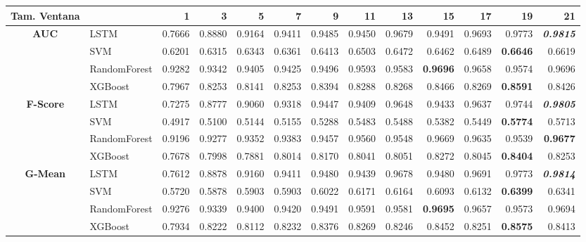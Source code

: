 \begin{table}[H]
	\centering
	\begin{adjustbox}{max width=14cm}
		\begin{tabular}{|c|l|r|r|r|r|r|r|r|r|r|r|r|}
			\hline
			\textbf{Tam. Ventana}&         &      1  &      3  &      5  &      7  &      9  &      11 &      13 &      15 &      17 &      19 &      21 \\
			\hline
			\textbf{AUC} & LSTM &  0.7666 &  0.8880 &  0.9164 &  0.9411 &  0.9485 &  0.9450 &  0.9679 &  0.9491 &  0.9693 &  0.9773 &  \textit{\textbf{0.9815}} \\
			& SVM &  0.6201 &  0.6315 &  0.6343 &  0.6361 &  0.6413 &  0.6503 &  0.6472 &  0.6462 &  0.6489 &  \textbf{0.6646} &  0.6619 \\
			& RandomForest &  0.9282 &  0.9342 &  0.9405 &  0.9425 &  0.9496 &  0.9593 &  0.9583 &  \textbf{0.9696} &  0.9658 &  0.9574 &  0.9696 \\
			& XGBoost &  0.7967 &  0.8253 &  0.8141 &  0.8253 &  0.8394 &  0.8288 &  0.8268 &  0.8466 &  0.8269 &  \textbf{0.8591} &  0.8426 \\
			\hline
			\textbf{F-Score} & LSTM &  0.7275 &  0.8777 &  0.9060 &  0.9318 &  0.9447 &  0.9409 &  0.9648 &  0.9433 &  0.9637 &  0.9744 &  \textit{\textbf{0.9805}} \\
			& SVM &  0.4917 &  0.5100 &  0.5144 &  0.5155 &  0.5288 &  0.5483 &  0.5488 &  0.5382 &  0.5449 &  \textbf{0.5774} &  0.5713 \\
			& RandomForest &  0.9196 &  0.9277 &  0.9352 &  0.9383 &  0.9457 &  0.9560 &  0.9548 &  0.9669 &  0.9635 &  0.9539 &  \textbf{0.9677} \\
			& XGBoost &  0.7678 &  0.7998 &  0.7881 &  0.8014 &  0.8170 &  0.8041 &  0.8051 &  0.8272 &  0.8045 &  \textbf{0.8404} &  0.8253 \\
			\hline
			\textbf{G-Mean} & LSTM &  0.7612 &  0.8878 &  0.9160 &  0.9411 &  0.9480 &  0.9439 &  0.9678 &  0.9480 &  0.9691 &  0.9773 &  \textit{\textbf{0.9814}} \\
			& SVM &  0.5720 &  0.5878 &  0.5903 &  0.5903 &  0.6022 &  0.6171 &  0.6164 &  0.6093 &  0.6132 &  \textbf{0.6399} &  0.6341 \\
			& RandomForest &  0.9276 &  0.9339 &  0.9400 &  0.9420 &  0.9491 &  0.9591 &  0.9581 &  \textbf{0.9695} &  0.9657 &  0.9573 &  0.9694 \\
			& XGBoost &  0.7934 &  0.8222 &  0.8112 &  0.8232 &  0.8376 &  0.8269 &  0.8246 &  0.8452 &  0.8251 &  \textbf{0.8575} &  0.8413 \\

\end{tabular}
\end{adjustbox}
\end{table}
